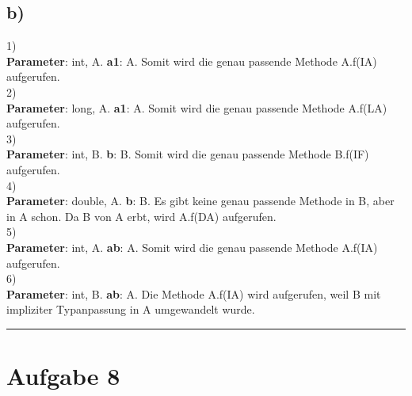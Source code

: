\documentclass[a4paper,11pt]{scrartcl}
\begin{document}
\subsection*{b)}

	1)\\
	\textbf{Parameter}: int, A.		\textbf{a1}: A.  Somit wird die genau passende Methode A.f(IA) aufgerufen.\\
	2)\\
	\textbf{Parameter}: long, A.		\textbf{a1}: A.  Somit wird die genau passende Methode A.f(LA) aufgerufen.\\
	3)\\
	\textbf{Parameter}: int, B.		\textbf{b}: B.  Somit wird die genau passende Methode B.f(IF) aufgerufen.\\
	4)\\
	\textbf{Parameter}: double, A.		\textbf{b}: B. Es gibt keine genau passende Methode in B, aber in A schon. Da B von A erbt, wird A.f(DA) aufgerufen.\\
	5)\\
	\textbf{Parameter}: int, A.		\textbf{ab}: A. Somit wird die genau passende Methode A.f(IA) aufgerufen.\\
	6)\\
	\textbf{Parameter}: int, B.		\textbf{ab}: A. Die Methode A.f(IA) wird aufgerufen, weil B mit impliziter Typanpassung in A umgewandelt wurde.









\rule{\textwidth}{0.2mm}



\section*{Aufgabe 8}

	\begin{lstlisting}[mathescape=true, language=java]

	\end{lstlisting}
\end{document}
